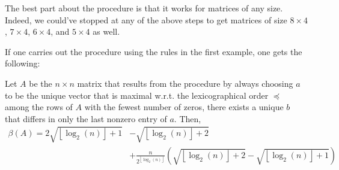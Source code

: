 \documentclass[12pt]{article}
\newenvironment{theorem}{\begin{mytheorem}}{\end{mytheorem}}
\theoremstyle{definitionstyle}
\newcommand{\floor}[1]{\left\lfloor#1\right\rfloor}
\begin{document}
The best part about the procedure is that it works for matrices of any size. Indeed, we could've stopped at any of the above steps to get matrices of size $8 \times 4$, $7 \times 4$, $6 \times 4$, and $5 \times 4$ as well.

If one carries out the procedure using the rules in the first example, one gets the following:
\newpage
\begin{theorem}
    Let $A$ be the $n \times n$ matrix that results from the procedure by always choosing $a$ to be the unique vector that is maximal w.r.t. the lexicographical order $\preceq$ among the rows of $A$ with the fewest number of zeros, there exists a unique $b$ that differs in only the last nonzero entry of $a$. Then,
    \begin{align*}
        \beta(A) = 2\sqrt{\floor{\log_2(n)}+1} &- \sqrt{\floor{\log_2(n)}+2}  \\ &+\frac{n}{2^{\floor{\log_2(n)}}}\left(\sqrt{\floor{\log_2(n)}+2} - \sqrt{\floor{\log_2(n)}+1}\right)
    \end{align*}
\end{theorem}
\end{document}
